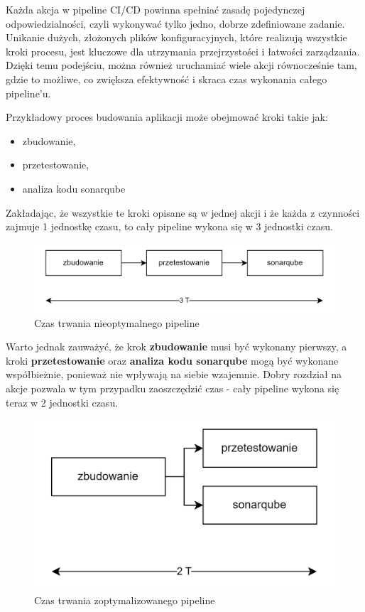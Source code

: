 \documentclass{article}
\begin{document}
Każda akcja w pipeline CI/CD powinna spełniać zasadę pojedynczej odpowiedzialności, czyli wykonywać tylko jedno, dobrze zdefiniowane zadanie. Unikanie dużych, złożonych plików konfiguracyjnych, które realizują wszystkie kroki procesu, jest kluczowe dla utrzymania przejrzystości i łatwości zarządzania. Dzięki temu podejściu, można również uruchamiać wiele akcji równocześnie tam, gdzie to możliwe, co zwiększa efektywność i skraca czas wykonania całego pipeline'u.

Przykładowy proces budowania aplikacji może obejmować kroki takie jak:

\begin{itemize}
    \item zbudowanie,
    \item przetestowanie,
    \item analiza kodu sonarqube
\end{itemize}

Zakładając, że wszystkie te kroki opisane są w jednej akcji i że każda z czynności zajmuje 1 jednostkę czasu, to cały pipeline wykona się w 3 jednostki czasu.

\begin{figure}[H]
    \centering
    \includegraphics[width=1\linewidth]{pipelines3T.png}
    \caption{Czas trwania nieoptymalnego pipeline}
    \label{fig:enter-label}
\end{figure}

Warto jednak zauważyć, że krok \textbf{zbudowanie} musi być wykonany pierwszy, a kroki \textbf{przetestowanie} oraz \textbf{analiza kodu sonarqube} mogą być wykonane współbieżnie, ponieważ nie wpływają na siebie wzajemnie. Dobry rozdział na akcje pozwala w tym przypadku zaoszczędzić czas - cały pipeline wykona się teraz w 2 jednostki czasu.

\begin{figure}[H]
    \centering
    \includegraphics[width=0.5\linewidth]{pipelines2T.png}
    \caption{Czas trwania zoptymalizowanego pipeline}
    \label{fig:enter-label}
\end{figure}
\end{document}
